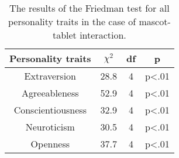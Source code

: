 \begin{table}[hbt!]
    \renewcommand{\arraystretch}{1}
    \begin{center}
        \begin{tabular}{|c|c|c|c|}
            \hline
            \textbf{Personality traits} & \textbf{$\chi^2$} & \textbf{df} & \textbf{p} \\
            \hline
            Extraversion &28.8 &4 &p<.01 \\
            Agreeableness &52.9 &4 &p<.01 \\
            Conscientiousness &32.9 &4 &p<.01 \\
            Neuroticism &30.5 &4 &p<.01 \\
            Openness &37.7 &4 &p<.01 \\
            \hline
        \end{tabular}
        \caption{The results of the Friedman test for all personality traits in the case of mascot-tablet interaction.}
        \label{table:friedmanMT1}
    \end{center}
\end{table}


